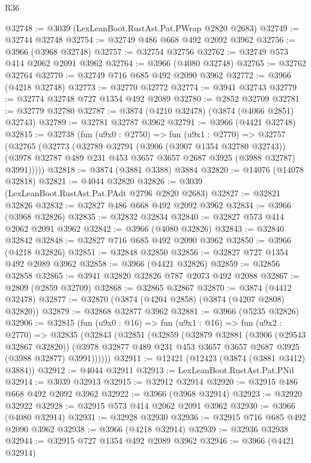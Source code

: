 \begin{lexlean}{R36}
\begin{coremodule}
@32748 := @3039 (LexLeanBoot.RustAst.Pat.PWrap @2820 @2683)
@32749 := @32744 @32748
@32754 := @32749 @486 @668 @492 @2092 @3962
@32756 := @3966 (@3968 @32748)
@32757 := @32754 @32756
@32762 := @32749 @573 @414 @2062 @2091 @3962
@32764 := @3966 (@4080 @32748)
@32765 := @32762 @32764
@32770 := @32749 @716 @685 @492 @2090 @3962
@32772 := @3966 (@4218 @32748)
@32773 := @32770 @32772
@32774 := @3941 @32743
@32779 := @32774 @32748 @727 @1354 @492 @2089
@32780 := @2852 @32709
@32781 := @32779 @32780
@32787 := @3874 (@4210 @32478) (@3874 (@4066 @2851) @32743)
@32789 := @32781 @32787 @3962
@32791 := @3966 (@4421 @32748)
@32815 := @32738
    (fun (u9x0 : @2750) =>
    fun (u9x1 : @2770) =>
    @32757
      (@32765
        (@32773
          (@32789
            @32791
            (@3906 (@3907 @1354 @32780 @32743))
            (@3978 @32787 @489 @231 @453 @3657 @3657 @2687 @3925 (@3988 @32787) @3991)))))
@32818 := @3874 (@3881 @3388) @3884
@32820 := @14076 (@14078 @32818)
@32821 := @4044 @32820
@32826 := @3039 (LexLeanBoot.RustAst.Pat.PAdt @2796 @2820 @2683)
@32827 := @32821 @32826
@32832 := @32827 @486 @668 @492 @2092 @3962
@32834 := @3966 (@3968 @32826)
@32835 := @32832 @32834
@32840 := @32827 @573 @414 @2062 @2091 @3962
@32842 := @3966 (@4080 @32826)
@32843 := @32840 @32842
@32848 := @32827 @716 @685 @492 @2090 @3962
@32850 := @3966 (@4218 @32826)
@32851 := @32848 @32850
@32856 := @32827 @727 @1354 @492 @2089 @3962
@32858 := @3966 (@4421 @32826)
@32859 := @32856 @32858
@32865 := @3941 @32820 @32826 @787 @2073 @492 @2088
@32867 := @2809 (@2859 @32709)
@32868 := @32865 @32867
@32870 := @3874 (@4412 @32478)
@32877 := @32870 (@3874 (@4204 @2858) (@3874 (@4207 @2808) @32820))
@32879 := @32868 @32877 @3962
@32881 := @3966 (@5235 @32826)
@32906 := @32815
    (fun (u9x0 : @16) =>
    fun (u9x1 : @16) =>
    fun (u9x2 : @2770) =>
    @32835
      (@32843
        (@32851
          (@32859
            (@32879
              @32881
              (@3906 (@29543 @32867 @32820))
              (@3978 @32877 @489 @231 @453 @3657 @3657 @2687 @3925 (@3988 @32877) @3991))))))
@32911 := @12421 (@12423 (@3874 (@3881 @3412) @3884))
@32912 := @4044 @32911
@32913 := LexLeanBoot.RustAst.Pat.PNil
@32914 := @3039 @32913
@32915 := @32912 @32914
@32920 := @32915 @486 @668 @492 @2092 @3962
@32922 := @3966 (@3968 @32914)
@32923 := @32920 @32922
@32928 := @32915 @573 @414 @2062 @2091 @3962
@32930 := @3966 (@4080 @32914)
@32931 := @32928 @32930
@32936 := @32915 @716 @685 @492 @2090 @3962
@32938 := @3966 (@4218 @32914)
@32939 := @32936 @32938
@32944 := @32915 @727 @1354 @492 @2089 @3962
@32946 := @3966 (@4421 @32914)

\end{coremodule}
\end{lexlean}
